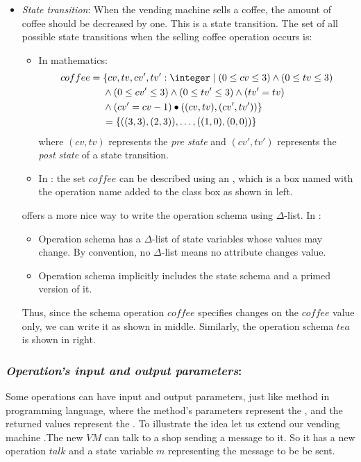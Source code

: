 \begin{itemize}
\item \textit{State transition}: When the vending machine sells a coffee, the amount of coffee should be decreased by one. This is a state transition.
The set of all possible state transitions when the selling coffee operation occurs is:
\begin{itemize}
\item In mathematics:
\begin{equation*}
\begin{aligned}
coffee ={} & \{cv,tv,cv',tv': \integer\mid (0 \leq  cv \leq 3) \wedge (0 \leq  tv \leq 3)\\
      & \wedge (0 \leq  cv' \leq 3) \wedge (0 \leq  tv' \leq 3)\wedge (tv' = tv)  \\
      & \wedge (cv' = cv - 1) \bullet\pair{\pair{cv}{tv}}{\pair{cv'}{tv'}}\} \\
      & =\{\pair{\pair{3}{3}}{\pair{2}{3}},\dots,\pair{\pair{1}{0}}{\pair{0}{0}}\}
\end{aligned}
\end{equation*}
 where $(cv,tv)$ represents the \textit{pre state} and $(cv',tv')$ represents the \textit{post state} of a state transition.
\item In \oz{}: the set $coffee$ can be described using an , which is a box named with the operation name added to the class box as shown in  left.
\end{itemize}



\oz{} offers a more nice way to write the operation schema using $\Delta$-list. In \oz{}:
\begin{itemize}
\item Operation schema has a $\Delta$-list of state variables
whose values may change. By convention, no $\Delta$-list means
no attribute changes value.
\item Operation schema implicitly
includes the state schema and a primed version of it.
\end{itemize}
Thus, since the schema operation $coffee$ specifies changes on the $coffee$ value only, we can write it as shown in  middle. 
Similarly, the operation schema $tea$ is shown in  right.
\end{itemize}

\subsubsection{\textit{Operation's input and output parameters}:} 
\label{operation_input_output_parameters} 
Some operations can have input and output parameters, just like method in programming language, where the method's parameters represent the , and the returned values represent the . To illustrate the idea let us extend our vending machine .The new $VM$ can talk to a shop sending a message to it. So it has a new operation $talk$ and a state variable $m$ representing the message to be be sent.


